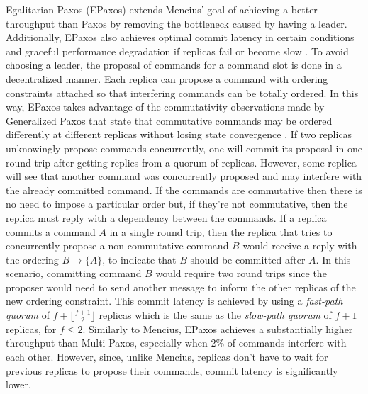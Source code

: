 \documentclass[runningheads,a4paper]{llncs}
\begin{document}
Egalitarian Paxos (EPaxos) extends Mencius' goal of achieving a better throughput than Paxos by removing the bottleneck caused by having a leader. Additionally, EPaxos also achieves optimal commit latency in certain conditions and graceful performance degradation if replicas fail or become slow \cite{Moraru2013}. To avoid choosing a leader, the proposal of commands for a command slot is done in a decentralized manner. Each replica can propose a command with ordering constraints attached so that interfering commands can be totally ordered. In this way, EPaxos takes advantage of the commutativity observations made by Generalized Paxos that state that commutative commands may be ordered differently at different replicas without losing state convergence \cite{Lamport2005}. If two replicas unknowingly propose commands concurrently, one will commit its proposal in one round trip after getting replies from a quorum of replicas. However, some replica will see that another command was concurrently proposed and may interfere with the already committed command. If the commands are commutative then there is no need to impose a particular order but, if they're not commutative, then the replica must reply with a dependency between the commands. If a replica commits a command $A$ in a single round trip, then the replica that tries to concurrently propose a non-commutative command $B$ would receive a reply with the ordering $B \rightarrow \{A\}$, to indicate that $B$ should be committed after $A$. In this scenario, committing command $B$ would require two round trips since the proposer would need to send another message to inform the other replicas of the new ordering constraint. This commit latency is achieved by using a \textit{fast-path quorum} of $f+\lfloor\frac{f+1}{2}\rfloor$ replicas which is the same as the \textit{slow-path quorum} of $f+1$ replicas, for $f \leq 2$. Similarly to Mencius, EPaxos achieves a substantially higher throughput than Multi-Paxos, especially when $2\%$ of commands interfere with each other. However, since, unlike Mencius, replicas don't have to wait for previous replicas to propose their commands, commit latency is significantly lower.
\end{document}
